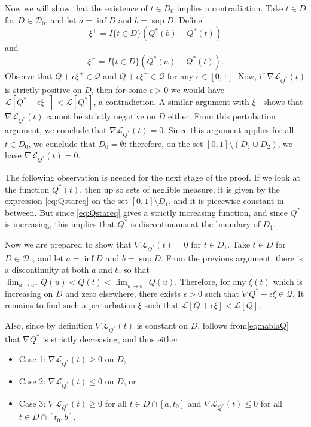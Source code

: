 Now we will show that the existence of $t \in D_0$ implies a contradiction.
Take $t \in D$ for $D \in \mathcal{D}_0$, and let $a = \inf D$ and $b
= \sup D$.  Define
\[
\xi^+ = I\{t \in D\} (Q^*(b) - Q^*(t))
\]
and
\[
\xi^- = I\{t \in D\} (Q^*(a) - Q^*(t)).
\]
Observe that $Q + \epsilon \xi^+ \in \mathcal{Q}$ and $Q
+ \epsilon \xi^- \in \mathcal{Q}$ for any $\epsilon \in [0,1]$.  Now,
if $\nabla \mathcal{L}_{Q^*}(t)$ is strictly positive on $D$, then for some
$\epsilon > 0$ we would have $\mathcal{L}[Q^* + \epsilon \xi^-]
< \mathcal{L}[Q^*]$, a contradiction.  A similar argument with $\xi^+$
shows that $\nabla \mathcal{L}_{Q^*}(t)$ cannot be strictly negative on $D$ either.
From this pertubation argument, we conclude that $\nabla \mathcal{L}_{Q^*}(t) = 0$.
Since this argument applies for all $t \in D_0$, we conclude that $D_0
= \emptyset$: therefore, on the set $[0,1] \setminus (D_1 \cup D_2)$,
we have $\nabla \mathcal{L}_{Q^*}(t) = 0.$

The following observation is needed for the next stage of the proof.
If we look at the function $Q^*(t)$, then up so sets of neglible
measure, it is given by the expression \eqref{eq:Qstareq} on the set
$[0,1]\setminus D_1$, and it is piecewise constant in-between.  But
since \eqref{eq:Qstareq} gives a strictly increasing function, and
since $Q^*$ is increasing, this implies that $Q^*$ is discontinuous at
the boundary of $D_1$.

Now we are prepared to show that $\nabla \mathcal{L}_{Q^*}(t) = 0$ for $t \in D_1$.
Take $t \in D$ for $D \in \mathcal{D}_1$, and let $a = \inf D$ and $b
= \sup D$.  From the previous argument, there is a discontinuity at
both $a$ and $b$, so that $\lim_{u \to a^-} Q(u) < Q(t) < \lim_{u \to
b^+} Q(u)$.  Therefore, for any $\xi(t)$ which is increasing on $D$
and zero elsewhere, there exists $\epsilon > 0$ such that $\nabla Q^*
+ \epsilon \xi \in \mathcal{Q}.$ It remains to find such a
perturbation $\xi$ such that $\mathcal{L}[Q + \epsilon \xi]
< \mathcal{L}[Q]$.

Also, since by definition $\nabla \mathcal{L}_{Q^*}(t)$ is constant on $D$, follows from\eqref{eq:nablaQ} that
$\nabla Q^*$ is strictly decreasing, and thus either
\begin{itemize}
\item Case 1: $\nabla \mathcal{L}_{Q^*}(t) \geq 0$ on $D$,
\item Case 2: $\nabla \mathcal{L}_{Q^*}(t) \leq 0$ on $D$, or
\item Case 3: $\nabla \mathcal{L}_{Q^*}(t) \geq 0$ for all $t \in D \cap [a, t_0]$ and $\nabla \mathcal{L}_{Q^*}(t) \leq 0$ for all $t \in D \cap [t_0, b]$.
\end{itemize}

